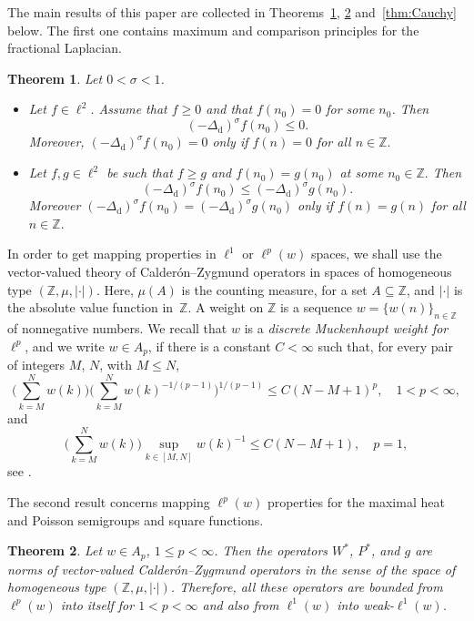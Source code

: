 \documentclass[11pt]{amsart}
\numberwithin{equation}{section}
\newcommand{\Z}{\mathbb{Z}}
\newcommand{\dis}{\mathrm{d}}
\theoremstyle{plain}
\newtheorem{thm}{Theorem}
\theoremstyle{remark}
\begin{document}
The main results of this paper are collected in Theorems~\ref{thm:fractional-Laplacian}, \ref{thm:semigroups-gg} and~\ref{thm:Cauchy} below. The first one contains maximum and comparison principles for the fractional Laplacian.

\begin{thm}
\label{thm:fractional-Laplacian}
Let $0<\sigma<1$.
\begin{itemize}
\item[(i)] Let $f\in \ell^2$. Assume that $f\ge 0$ and that $f(n_0)=0$ for some $n_0$. Then
\[
(-\Delta_{\dis})^\sigma f(n_0) \le 0.
\]
Moreover, $(-\Delta_{\dis})^\sigma f(n_0) =0$ only if $f(n) = 0$ for all $n\in \Z.$
\item[(ii)] Let $f,g \in \ell^2$ be such that $f\ge g$ and $f(n_0)=g(n_0)$ at some $n_0\in \Z.$ Then
\[
(-\Delta_{\dis})^\sigma f(n_0) \le (-\Delta_{\dis})^\sigma g(n_0). 
\]
Moreover $(-\Delta_{\dis})^\sigma f(n_0) = (-\Delta_{\dis})^\sigma g(n_0) $ only if $f(n) = g(n)$ for all $n\in \Z.$
\end{itemize}
\end{thm}

In order to get mapping properties in $\ell^1$ or $\ell^p(w)$ spaces, we shall use the vector-valued theory of Calder\'on--Zygmund operators in spaces of homogeneous type $(\Z,\mu,|\cdot|)$. Here, $\mu(A)$ is the counting measure, for a set $A\subseteq \Z$, and $|\cdot|$ is the absolute value function in~$\Z$. A weight on $\Z$ is a sequence $w=\{w(n)\}_{n\in\Z}$ of nonnegative numbers.
We recall  that $w$ is a \textit{discrete Muckenhoupt weight for~$\ell^p$}, and we write $w\in A_p$, if there is a constant $C<\infty$ such that, for every pair of integers $M$, $N$, with $M\le N$,
\begin{equation*}
\Big(\sum_{k=M}^{N}w(k)\Big) \Big(\sum_{k=M}^N w(k)^{-1/(p-1)}\Big)^{1/(p-1)}\le C (N-M+1)^p, \quad 1<p<\infty,
\end{equation*}
and
\[
\Big(\sum_{k=M}^{N}w(k)\Big)\sup_{k\in [M,N]}w(k)^{-1}\le C(N-M+1), \quad p=1,
\]
see \cite[Section~8]{HuMuWh}.

The second result concerns mapping $\ell^p(w)$ properties for the maximal heat and Poisson semigroups and square functions.

\begin{thm}
\label{thm:semigroups-gg}
Let $w\in  A_p$, $1\le p<\infty$. Then the operators $W^*$, $P^*$, and $g$ are norms of vector-valued Calder\'on--Zygmund operators in the sense of the space of homogeneous type $(\Z,\mu,|\cdot|)$.
Therefore, all these operators are bounded from $\ell^p(w)$ into itself for $1<p<\infty$
and also from $\ell^1(w)$ into weak-$\ell^1(w)$.
\end{thm}
\end{document}
